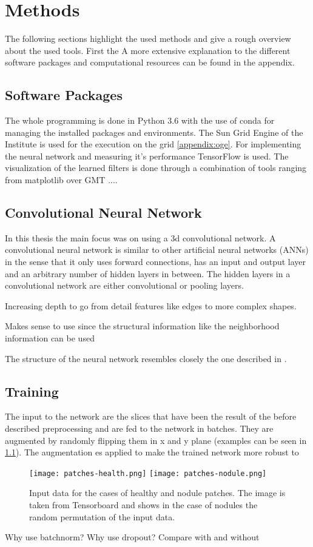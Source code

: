 \documentclass[main.tex]{subfiles}
\begin{document}
\chapter{Methods}\label{chap:03methods}
The following sections highlight the used methods and give a rough overview about the used tools. First the   A more extensive explanation to the different software packages and computational resources can be found in the appendix.

\section{Software Packages}
The whole programming is done in Python 3.6 with the use of conda for managing the installed packages and environments. The Sun Grid Engine of the Institute is used for the execution on the grid \ref{appendix:oge}. For implementing the neural network and measuring it's performance TensorFlow is used. The visualization of the learned filters is done through a combination of tools ranging from matplotlib over GMT ....

\section{Convolutional Neural Network}
In this thesis the main focus was on using a 3d convolutional network. A convolutional neural network is similar to other artificial neural networks (ANNs) in the sense that it only uses forward connections, has an input and output layer and an arbitrary number of hidden layers in between. The hidden layers in a convolutional network are either convolutional or pooling layers. 

Increasing depth to go from detail features like edges to more complex shapes.

Makes sense to use since the structural information like the neighborhood information can be used


The structure of the neural network resembles closely the one described in \cite{huang2017lung}. 



\section{Training}
The input to the network are the slices that have been the result of the before described preprocessing and are fed to the network in batches. They are augmented by randomly flipping them in x and y plane (examples can be seen in \ref{fig:input}). The augmentation es applied to make the trained network more robust to 

\begin{figure}
\begin{center}
\texttt{[image: patches-health.png]}
\texttt{[image: patches-nodule.png]}
\end{center}
\caption{Input data for the cases of healthy and nodule patches. The image is taken from Tensorboard and shows in the case of nodules the random permutation of the input data.}
\label{fig:input}
\end{figure}

Why use batchnorm?
Why use dropout?
Compare with and without
\end{document}
